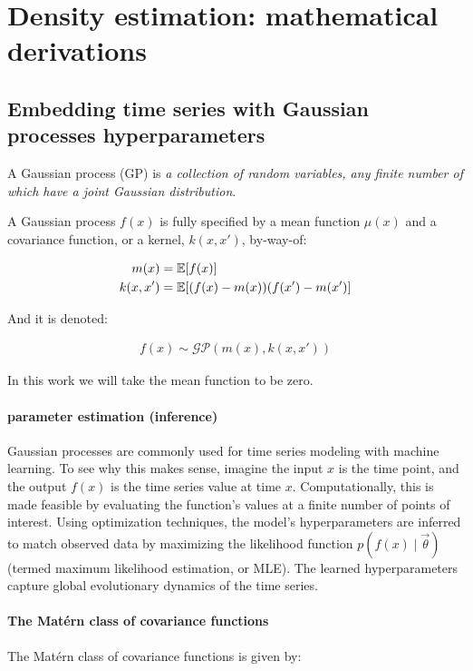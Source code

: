\appendix


\chapter{Density estimation: mathematical derivations}
\label{apx:DEMath}
\section{Embedding time series with Gaussian processes hyperparameters}
\label{apx:GPEmbed}
A Gaussian process (GP) \cite{rasmussen2006cki} is \emph{a collection of random variables, any finite number of which have a joint Gaussian distribution}.

A Gaussian process $f(x)$ is fully specified by a mean function $\mu(x)$ and a covariance function, or a kernel, $k(x,x')$, by-way-of:

\begin{align}
    m(x) &= \operatorname{\mathbb{E}}[f(x)] \\
k(x,x') &= \operatorname{\mathbb{E}}[(f(x)-m(x))(f(x')-m(x')]
\end{align}

And it is denoted:

\begin{align}
    f(x) \sim \mathcal{GP}(m(x), k(x,x'))
\end{align}

In this work we will take the mean function to be zero.

\subsubsection{parameter estimation (inference)}
Gaussian processes are commonly used for time series modeling with machine learning. To see why this makes sense, imagine the input $x$ is the time point, and the output $f(x)$ is the time series value at time $x$. Computationally, this is made feasible by evaluating the function's values at a finite number of points of interest.
Using optimization techniques, the model's hyperparameters are inferred to match observed data by maximizing the likelihood function $p(f(x) \mid \Vec{\theta})$ (termed maximum likelihood estimation, or MLE). The learned hyperparameters capture global evolutionary dynamics of the time series.


\subsubsection{The Matérn class of covariance functions}
The Matérn class of covariance functions is given by:

